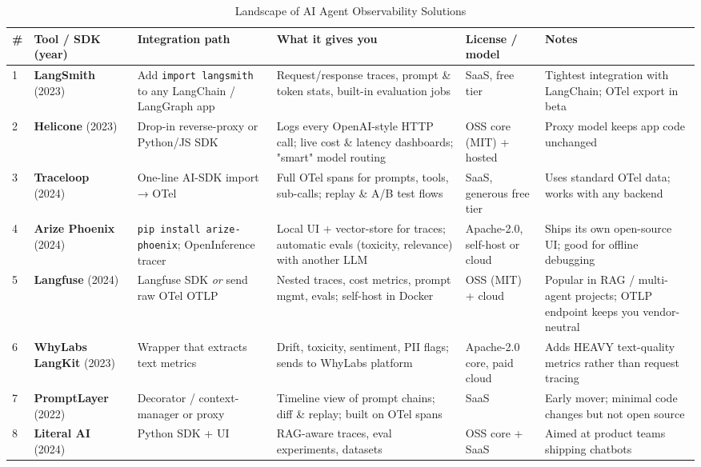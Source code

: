 \begin{table*}[t]
\caption{Landscape of AI Agent Observability Solutions}
\label{tab:landscape}
\centering
\scriptsize
\begin{tabular}{p{0.3cm} p{2.2cm} p{2.5cm} p{2.8cm} p{1.5cm} p{2.2cm}}
\toprule
\# & Tool / SDK (year) & Integration path & What it gives you & License / model & Notes \\
\midrule
1 & \textbf{LangSmith} (2023)~\cite{langsmith} & Add \texttt{import langsmith} to any LangChain / LangGraph app & Request/response traces, prompt \& token stats, built-in evaluation jobs & SaaS, free tier & Tightest integration with LangChain; OTel export in beta \\
2 & \textbf{Helicone} (2023)~\cite{helicone} & Drop-in reverse-proxy or Python/JS SDK & Logs every OpenAI-style HTTP call; live cost \& latency dashboards; "smart" model routing & OSS core (MIT) + hosted & Proxy model keeps app code unchanged \\
3 & \textbf{Traceloop} (2024)~\cite{traceloop} & One-line AI-SDK import → OTel & Full OTel spans for prompts, tools, sub-calls; replay \& A/B test flows & SaaS, generous free tier & Uses standard OTel data; works with any backend \\
4 & \textbf{Arize Phoenix} (2024)~\cite{phoenix} & \texttt{pip install arize-phoenix}; OpenInference tracer & Local UI + vector-store for traces; automatic evals (toxicity, relevance) with another LLM & Apache-2.0, self-host or cloud & Ships its own open-source UI; good for offline debugging \\
5 & \textbf{Langfuse} (2024)~\cite{langfuse} & Langfuse SDK \emph{or} send raw OTel OTLP & Nested traces, cost metrics, prompt mgmt, evals; self-host in Docker & OSS (MIT) + cloud & Popular in RAG / multi-agent projects; OTLP endpoint keeps you vendor-neutral \\
6 & \textbf{WhyLabs LangKit} (2023)~\cite{whylabs} & Wrapper that extracts text metrics & Drift, toxicity, sentiment, PII flags; sends to WhyLabs platform & Apache-2.0 core, paid cloud & Adds HEAVY text-quality metrics rather than request tracing \\
7 & \textbf{PromptLayer} (2022)~\cite{promptlayer} & Decorator / context-manager or proxy & Timeline view of prompt chains; diff \& replay; built on OTel spans & SaaS & Early mover; minimal code changes but not open source \\
8 & \textbf{Literal AI} (2024)~\cite{literalai} & Python SDK + UI & RAG-aware traces, eval experiments, datasets & OSS core + SaaS & Aimed at product teams shipping chatbots \\

\end{tabular}
\end{table*}

